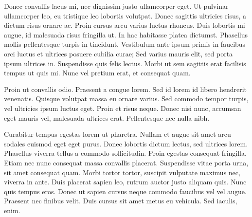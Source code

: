 \documentclass{article}
\begin{document}
Donec convallis lacus mi, nec dignissim justo ullamcorper eget. Ut
pulvinar ullamcorper leo, eu tristique leo lobortis volutpat. Donec
sagittis ultricies risus, a dictum risus ornare ac. Proin cursus arcu
varius luctus rhoncus. Duis lobortis mi augue, id malesuada risus
fringilla ut. In hac habitasse platea dictumst. Phasellus mollis
pellentesque turpis in tincidunt. Vestibulum ante ipsum primis in
faucibus orci luctus et ultrices posuere cubilia curae; Sed varius
mauris elit, sed porta ipsum ultrices in. Suspendisse quis felis lectus.
Morbi ut sem sagittis erat facilisis tempus ut quis mi. Nunc vel pretium
erat, et consequat quam.

Proin ut convallis odio. Praesent a congue lorem. Sed id lorem id libero
hendrerit venenatis. Quisque volutpat massa eu ornare varius. Sed
commodo tempor turpis, vel ultricies ipsum luctus eget. Proin et risus
neque. Donec nisi nunc, accumsan eget mauris vel, malesuada ultrices
erat. Pellentesque nec nulla nibh.

Curabitur tempus egestas lorem ut pharetra. Nullam et augue sit amet
arcu sodales euismod eget eget purus. Donec lobortis dictum lectus, sed
ultrices lorem. Phasellus viverra tellus a commodo sollicitudin. Proin
egestas consequat fringilla. Etiam nec nunc consequat massa convallis
placerat. Suspendisse vitae porta urna, sit amet consequat quam. Morbi
tortor tortor, suscipit vulputate maximus nec, viverra in ante. Duis
placerat sapien leo, rutrum auctor justo aliquam quis. Nunc quis tempus
eros. Donec ut sapien cursus neque commodo faucibus vel vel augue.
Praesent nec finibus velit. Duis cursus sit amet metus eu vehicula. Sed
iaculis, enim.


\end{document}

